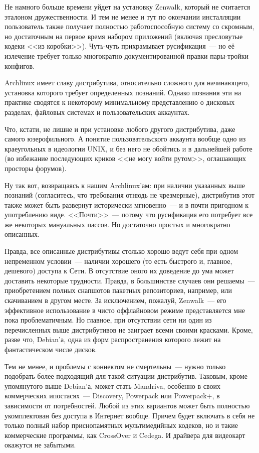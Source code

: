 Не намного больше времени уйдет на установку Zenwalk, который не считается эталоном дружественности. И тем не менее и тут по окончании инсталляции пользователь также получает полностью работоспособную систему со скромным, но достаточным на первое время набором приложений (включая пресловутые кодеки <<из коробки>>). Чуть-чуть прихрамывает русификация~--- но её излечение требует только многократно документированной правки пары-тройки конфигов. 

Archlinux имеет славу дистрибутива, относительно сложного для начинающего, установка которого требует определенных познаний. Однако познания эти на практике сводятся к некоторому минимальному представлению о дисковых разделах, файловых системах и пользовательских аккаунтах.

Что, кстати, не лишне и при установке любого другого дистрибутива, даже самого юзерофильного. А понятие пользовательского аккаунта вообще одно из краеугольных в идеологии UNIX, и без него не обойтись и в дальнейшей работе (во избежание последующих криков <<не могу войти рутом>>, оглашающих просторы форумов).

Ну так вот, возвращаясь к нашим Archlinux'ам: при наличии указанных выше познаний (согласитесь, что требования отнюдь не чрезмерные), дистрибутив этот также может быть развернут исторически мгновенно~--- и в почти пригодном к употреблению виде. <<Почти>>~--- потому что русификация его потребует все же некоторых мануальных пассов. Но достаточно простых и многократно описанных.

Правда, все описанные дистрибутивы столько хорошо ведут себя при одном непременном условии~--- наличии хорошего (то есть быстрого и, главное, дешевого) доступа к Сети. В отсутствие оного их доведение до ума может доставить некоторые трудности. Правда, в большинстве случаев они решаемы~--- приобретением полных снапшотов пакетных репозиториев, например, или скачиванием в другом месте. За исключением, пожалуй, Zenwalk~--- его эффективное использование в чисто оффлайновом режиме представляется мне пока проблематичным. Но главное, при отсутствии сети ни один из перечисленных выше дистрибутивов не заиграет всеми своими красками. Кроме, разве что, Debian'а, одна из форм распространения которого лежит на фантастическом числе дисков.

Тем не менее, и проблемы с коннектом не смертельны~--- нужно только подобрать более подходящий для такой ситуации дистрибутив. Таковым, кроме упомянутого выше Debian'а, может стать Mandriva, особенно в своих коммерческих ипостасях~--- Discovery, Powerpack или Powerpack+, в зависимости от потребностей. Любой из этих вариантов может быть полностью укомплектован без доступа в Интернет вообще. Причем будет включать в себя не только полный набор приснопамятных мультимедийных кодеков, но и такие коммерческие программы, как CrossOver и Cedega. И драйвера для видеокарт окажутся не забытыми.

